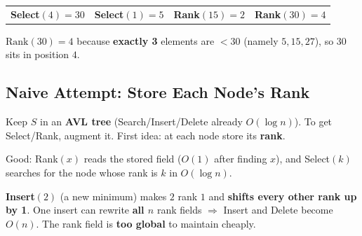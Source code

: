 \documentclass[11pt]{article}
\begin{document}
\begin{examplebox}[Select and Rank on $S=\{5,15,27,30,56\}$]
\begin{center}
\renewcommand{\arraystretch}{1.3}
\begin{tabular}{l l l l}
\textbf{Select}$(4) = 30$ & \textbf{Select}$(1) = 5$ & \textbf{Rank}$(15) = 2$ & \textbf{Rank}$(30) = 4$\\
\end{tabular}
\end{center}
$\text{Rank}(30)=4$ because \textbf{exactly 3} elements are $< 30$ (namely $5, 15, 27$), so $30$ sits in position $4$.
\end{examplebox}

\subsection{Naive Attempt: Store Each Node's Rank}

Keep $S$ in an \textbf{AVL tree} (Search/Insert/Delete already $O(\log n)$). To get Select/Rank, augment it. First idea: at each node store its \textbf{rank}.

\begin{center}
\end{center}

\begin{keybox}
\textcolor{greenO}{Good:} Rank$(x)$ reads the stored field ($O(1)$ after finding $x$), and Select$(k)$ searches for the node whose rank is $k$ in $O(\log n)$.
\end{keybox}

\begin{warnbox}
\textbf{Insert$(2)$} (a new minimum) makes $2$ rank $1$ and \textbf{shifts every other rank up by 1}. One insert can rewrite \textbf{all $n$} rank fields $\Rightarrow$ Insert and Delete become \textcolor{rustW}{$O(n)$}. The rank field is \textbf{too global} to maintain cheaply.
\end{warnbox}
\end{document}
